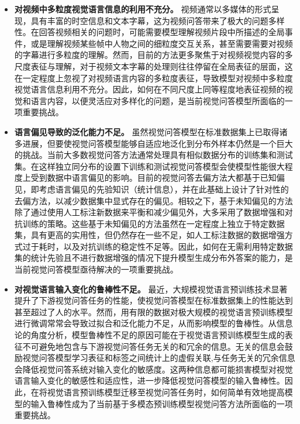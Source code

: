 \begin{itemize}[wide,leftmargin=0pt,itemsep=1pt]
\item\textbf{对视频中多粒度视觉语言信息的利用不充分。} 视频通常以多媒体的形式呈现，具有丰富的时空信息和文本字幕，这为视频问答带来了极大的问题多样性。在回答视频相关的问题时，可能需要模型理解视频片段中所描述的全局事件，或是理解视频某些帧中人物之间的细粒度交互关系，甚至需要需要对视频的字幕进行多粒度的理解。然而，目前的方法更多聚焦于对视频视觉内容的多尺度表征与理解，对于视频文本字幕的处理则往往停留在全局表征的层面，这在一定程度上忽视了对视频语言内容的多粒度表征，导致模型对视频中多粒度视觉语言信息利用不充分。因此，如何在不同尺度上同等程度地表征视频的视觉和语言内容，以便灵活应对多样化的问题，是当前视觉问答模型所面临的一项重要挑战。

\item\textbf{语言偏见导致的泛化能力不足。} 虽然视觉问答模型在标准数据集上已取得诸多进展，但要使视觉问答模型能够自适应地泛化到分布外样本仍然是一个巨大的挑战。当前大多数视觉问答方法通常处理具有相似数据分布的训练集和测试集。在这样独立同分布的设置下训练和测试视觉问答模型会使模型性能很大程度上受到数据中语言偏见的影响。目前的视觉问答去偏方法大都基于已知偏见，即考虑语言偏见的先验知识（统计信息），并在此基础上设计了针对性的去偏方法，以减少数据集中显式存在的偏见。相较之下，基于未知偏见的方法除了通过使用人工标注新数据来平衡和减少偏见外，大多采用了数据增强和对抗训练的策略。这些基于未知偏见的方法虽然在一定程度上独立于特定数据集，具有更高的实用性，但仍然存在一些不足，如人工标注数据的数据增强方式过于耗时，以及对抗训练的稳定性不足等。因此，如何在无需利用特定数据集的统计先验且不进行数据增强的情况下提升模型生成分布外答案的能力，是当前视觉问答模型亟待解决的一项重要挑战。

\item\textbf{对视觉语言输入变化的鲁棒性不足。} 最近，大规模视觉语言预训练技术显著提升了下游视觉问答任务的性能，使视觉问答模型在标准数据集上的性能达到甚至超过了人的水平。然而，用有限的数据对极大规模的视觉语言预训练模型进行微调常常会导致过拟合和泛化能力不足，从而影响模型的鲁棒性。从信息论的角度分析，模型鲁棒性不足的原因可能在于视觉语言预训练模型生成的表征不可避免地包含与下游视觉问答任务无关的和冗余的信息。无关的信息会鼓励视觉问答模型学习表征和标签之间统计上的虚假关联,与任务无关的冗余信息会降低视觉问答系统对输入变化的敏感度。这两种信息都可能损害模型对视觉语言输入变化的敏感性和适应性，进一步降低视觉问答模型的输入鲁棒性。因此，在将视觉语言预训练模型迁移至视觉问答任务时，如何简单有效地提高模型的输入鲁棒性成为了当前基于多模态预训练模型视觉问答方法所面临的一项重要挑战。



\end{itemize}
